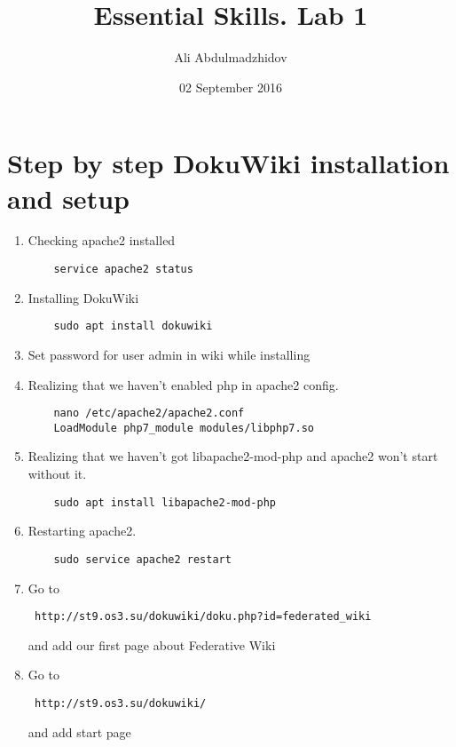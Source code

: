 \documentclass[10pt]{article}
\title{Essential Skills. Lab 1}
\date{02 September 2016}
\author{Ali Abdulmadzhidov}
\begin{document}
\renewcommand*\rmdefault{cmss}
  \maketitle
  \section{Step by step DokuWiki installation and setup     \newline}

  \begin{enumerate}
    \item Checking apache2 installed
    \begin{verbatim}
    service apache2 status
    \end{verbatim}
    \item Installing DokuWiki
    \begin{verbatim}
    sudo apt install dokuwiki
    \end{verbatim}
    \item Set password for user admin in wiki while installing
    \item Realizing that we haven't enabled php in apache2 config. 
    \begin{verbatim}
    nano /etc/apache2/apache2.conf
    LoadModule php7_module modules/libphp7.so 
    \end{verbatim}
    \item Realizing that we haven't got libapache2-mod-php and apache2 won't start without it. 
    \begin{verbatim}
    sudo apt install libapache2-mod-php 
    \end{verbatim}
    \item Restarting apache2. 
    \begin{verbatim}
    sudo service apache2 restart
    \end{verbatim}
    \item Go to \begin{verbatim} http://st9.os3.su/dokuwiki/doku.php?id=federated_wiki \end{verbatim} and add our first page about Federative Wiki
    \item Go to \begin{verbatim} http://st9.os3.su/dokuwiki/ \end{verbatim} and add start page
  \end{enumerate}
\end{document}
